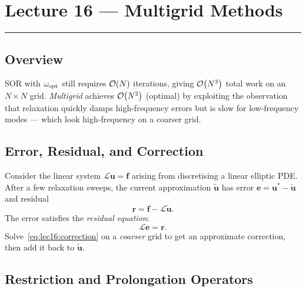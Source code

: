 
\section{Lecture 16 — Multigrid Methods}\label{sec:lec16}
\hrule\vspace{1.5em}

\subsection*{Overview}
SOR with $\omega_{\rm opt}$ still requires $\mathcal{O}\!\left(N\right)$ iterations,
giving $\mathcal{O}\!\left(N^3\right)$ total work on an $N\times N$ grid.
\emph{Multigrid} achieves $\mathcal{O}\!\left(N^2\right)$ (optimal) by exploiting the
observation that relaxation quickly damps high-frequency errors
but is slow for low-frequency modes — which look high-frequency on
a coarser grid.

\subsection{Error, Residual, and Correction}\label{subsec:lec16:err}

Consider the linear system $\mathcal{L}\mathbf{u} = \mathbf{f}$
arising from discretising a linear elliptic PDE.  After a few
relaxation sweeps, the current approximation $\tilde{\mathbf{u}}$
has error $\mathbf{e} = \mathbf{u}^* - \tilde{\mathbf{u}}$
and residual
\begin{equation}
  \mathbf{r} = \mathbf{f} - \mathcal{L}\tilde{\mathbf{u}}.
  \label{eq:lec16:residual}
\end{equation}
The error satisfies the \emph{residual equation}:
\begin{equation}
  \mathcal{L}\mathbf{e} = \mathbf{r}.
  \label{eq:lec16:correction}
\end{equation}
Solve~\eqref{eq:lec16:correction} on a \emph{coarser} grid to get an
approximate correction, then add it back to $\tilde{\mathbf{u}}$.

\subsection{Restriction and Prolongation Operators}\label{subsec:lec16:ops}


